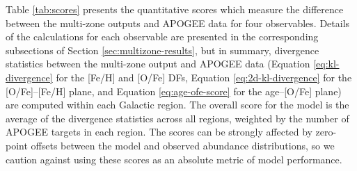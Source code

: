 \documentclass[twocolumn,twocolappendix]{aastex631}
\begin{document}
Table \ref{tab:scores} presents the quantitative scores which measure the difference between the multi-zone outputs and APOGEE data for four observables. Details of the calculations for each observable are presented in the corresponding subsections of Section \ref{sec:multizone-results}, but in summary, divergence statistics between the multi-zone output and APOGEE data (Equation \ref{eq:kl-divergence} for the [Fe/H] and [O/Fe] DFs, Equation \ref{eq:2d-kl-divergence} for the [O/Fe]--[Fe/H] plane, and Equation \ref{eq:age-ofe-score} for the age--[O/Fe] plane) are computed within each Galactic region. The overall score for the model is the average of the divergence statistics across all regions, weighted by the number of APOGEE targets in each region. The scores can be strongly affected by zero-point offsets between the model and observed abundance distributions, so we caution against using these scores as an absolute metric of model performance.


\end{document}
